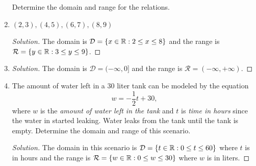 \documentclass{article}
\begin{document}
\begin{enumerate}
Determine the domain and range for the relations.
\item \( (2,3), (4,5), (6,7), (8,9)\)
    \begin{proof}[Solution]
        The domain is \( \mathcal{D} = \{x \in \mathbb{R} : 2 \leq x \leq 8  \}\) and the range is \( \mathcal{R} = \{ y \in \mathbb{R} : 3 \leq y \leq 9  \}\). 
    \end{proof}
\item 
    \begin{proof}[Solution]
        The domain is \( \mathcal{D} = (-\infty, 0 ]\) and the range is \( \mathcal{R} = (-\infty, +\infty)\).
    \end{proof}
\item The amount of water left in a \( 30 \) liter tank can be modeled by the equation 
    \[ w = -\frac{1}{2}t + 30, \]
    where \( w \) is the \textit{amount of water left in the tank} and \( t \) is \textit{time in hours} since the water in started leaking. Water leaks from the tank until the tank is empty. Determine the domain and range of this scenario.
    \begin{proof}[Solution]
        The domain in this scenario is \( \mathcal{D} = \{ t \in \mathbb{R}: 0 \leq t \leq 60  \}\) where \(t\) is in hours and the range is \( \mathcal{R} = \{ w \in \mathbb{R} : 0 \leq w \leq 30 \}\) where \(w\) is in liters.
    \end{proof}


\end{enumerate}
\end{document}

